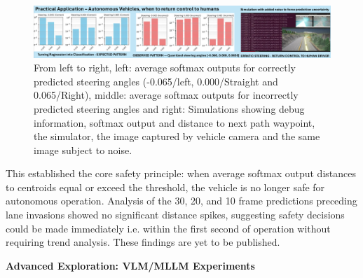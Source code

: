 \begin{figure}[ht!]
    \centering
    \includegraphics[width=0.99\columnwidth]{Figures/Methods/PracticalApplicationAVReturnVehicleControlToHuman.png}
    \caption{From left to right, left: average softmax outputs for correctly predicted steering angles (-0.065/left, 0.000/Straight and 0.065/Right), middle: average softmax outputs for incorrectly predicted steering angles and right: Simulations showing debug information, softmax output and distance to next path waypoint, the simulator, the image captured by vehicle camera and the same image subject to noise.}
\label{fig:PracticalApplicationAVReturnVehicleControlToHuman}
\end{figure}

This established the core safety principle: when average softmax output distances to centroids equal or exceed the threshold, the vehicle is no longer safe for autonomous operation. Analysis of the 30, 20, and 10 frame predictions preceding lane invasions showed no significant distance spikes, suggesting safety decisions could be made immediately i.e. within the first second of operation without requiring trend analysis. These findings are yet to be published.

\textbf{Advanced Exploration: VLM/MLLM Experiments}

